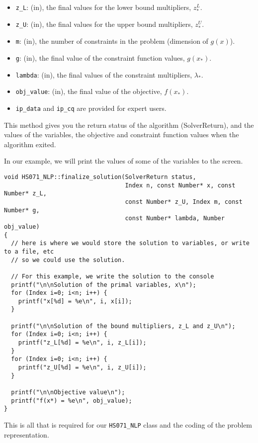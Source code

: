 \documentclass[10pt]{article}
\begin{document}
\begin{itemize}
\item {\tt z\_L}: (in), the final values for the lower bound
  multipliers, $z^L_*$.
\item {\tt z\_U}: (in), the final values for the upper bound
  multipliers, $z^U_*$.
\item {\tt m}: (in), the number of constraints in the problem
  (dimension of $g(x)$).
\item {\tt g}: (in), the final value of the constraint function
  values, $g(x_*)$.
\item {\tt lambda}: (in), the final values of the constraint
  multipliers, $\lambda_*$.
\item {\tt obj\_value}: (in), the final value of the objective,
  $f(x_*)$.
\item {\tt ip\_data} and {\tt ip\_cq} are provided for expert users.
\end{itemize}

This method gives you the return status of the algorithm
(SolverReturn), and the values of the variables, 
the objective and constraint function values when the algorithm exited.

In our example, we will print the values of some of the variables to 
the screen.

\begin{footnotesize}
\begin{verbatim}
void HS071_NLP::finalize_solution(SolverReturn status,
                                  Index n, const Number* x, const Number* z_L,
                                  const Number* z_U, Index m, const Number* g,
                                  const Number* lambda, Number obj_value)
{
  // here is where we would store the solution to variables, or write to a file, etc
  // so we could use the solution. 

  // For this example, we write the solution to the console
  printf("\n\nSolution of the primal variables, x\n");
  for (Index i=0; i<n; i++) {
    printf("x[%d] = %e\n", i, x[i]); 
  }

  printf("\n\nSolution of the bound multipliers, z_L and z_U\n");
  for (Index i=0; i<n; i++) {
    printf("z_L[%d] = %e\n", i, z_L[i]); 
  }
  for (Index i=0; i<n; i++) {
    printf("z_U[%d] = %e\n", i, z_U[i]); 
  }

  printf("\n\nObjective value\n");
  printf("f(x*) = %e\n", obj_value); 
}
\end{verbatim}
\end{footnotesize}

This is all that is required for our {\tt HS071\_NLP} class and 
the coding of the problem representation.
 
\end{document}
